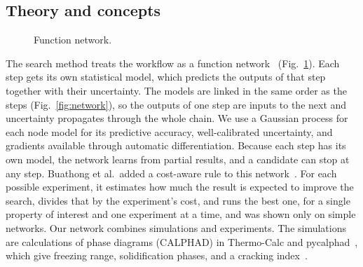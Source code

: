 \documentclass[12pt,letterpaper]{article}
\begin{document}
\subsection{Theory and concepts}
%
\begin{figure}
\vspace{-14pt}
\centering
{}
\caption{Function network.}
\label{fig:fn}
\end{figure}
The search method treats the workflow as a function
network~\cite{astudillo2021} (Fig.~\ref{fig:fn}). Each step gets its own
statistical model, which predicts the outputs of that step together with
their uncertainty. The models are linked in the same order as the steps
(Fig.~\ref{fig:network}), so the outputs of one step are inputs to the next
and uncertainty propagates through the whole chain. We use a Gaussian process
for each node model for its predictive accuracy, well-calibrated uncertainty,
and gradients available through automatic differentiation. Because each step
has its own model, the network learns from partial results, and a candidate
can stop at any step. Buathong et al.\ added a cost-aware rule to this
network~\cite{buathong2024}. For each possible experiment, it estimates how
much the result is expected to improve the search, divides that by the
experiment's cost, and runs the best one, for a single property of interest
and one experiment at a time, and was shown only on simple networks. Our network combines simulations and experiments. The simulations
are calculations of phase diagrams (CALPHAD) in Thermo-Calc and
pycalphad~\cite{andersson2002,otis2017}, which give freezing range,
solidification phases, and a cracking index~\cite{kou2015}.
\end{document}
